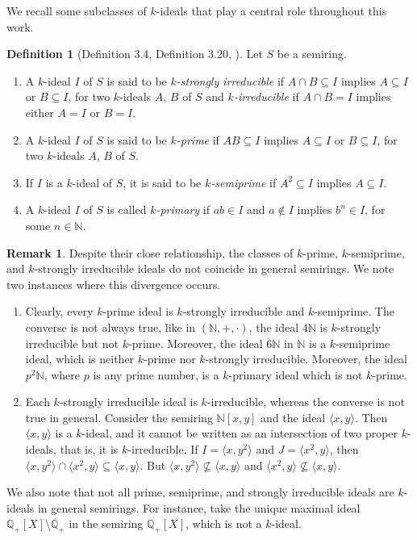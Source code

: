 \documentclass[11pt,english]{amsart}
\theoremstyle{definition}
\newtheorem{definition}[theorem]{Definition}
\newtheorem{remark}[theorem]{Remark}
\numberwithin{equation}{section}
\begin{document}
We recall some subclasses of $k$-ideals that play a central role throughout this work.

\begin{definition}[Definition 3.4, Definition 3.20, \cite{GoswamiDube24}]
Let $S$ be a semiring. 
    \begin{enumerate}
        \item A $k$-ideal $I$ of $S$ is said to be \emph{$k$-strongly irreducible} if $A\cap B \subseteq I$ implies $A\subseteq I$ or $B\subseteq I$, for two $k$-ideals $A$, $B$ of $S$ and \emph{$k$-irreducible} if $A\cap B=I$ implies either $A=I$ or $B=I$.
        
        \item A $k$-ideal $I$ of $S$ is said to be \emph{$k$-prime} if $AB\subseteq I$ implies $A\subseteq I$ or $B\subseteq I$, for two $k$-ideals $A$, $B$ of $S$.
        
        \item If $I$ is a $k$-ideal of $S$, it is said to be \emph{$k$-semiprime} if $A^2\subseteq I$ implies $A\subseteq I$. 
        
        \item A $k$-ideal $I$ of $S$ is called \emph{$k$-primary} if $ab\in I$ and $a\notin I$ implies $b^n\in I$, for some $n\in \mathds{N}$.
    \end{enumerate}
\end{definition}

\begin{remark}\label{Remark: ideal classes are different} Despite their close relationship, the classes of $k$-prime, $k$-semiprime, and $k$-strongly irreducible ideals do not coincide in general semirings. We note two instances where this divergence occurs. 
\begin{enumerate}
    \item Clearly, every $k$-prime ideal is $k$-strongly irreducible and $k$-semiprime. The converse is not always true, like in $(\mathds{N},+,\cdot)$, the ideal $4\mathds{N}$ is $k$-strongly irreducible but not $k$-prime. Moreover, the ideal $6\mathds{N}$ in $\mathds{N}$ is a $k$-semiprime ideal, which is neither $k$-prime nor $k$-strongly irreducible. Moreover, the ideal $p^2\mathds{N}$, where $p$ is any prime number, is a $k$-primary ideal which is not $k$-prime. 
    \item Each $k$-strongly irreducible ideal is $k$-irreducible, whereas the converse is not true in general. Consider the semiring $\mathds{N}[x,y]$ and the ideal $\langle x,y\rangle$. Then $\langle x,y\rangle$ is a $k$-ideal, and it cannot be written as an intersection of two proper $k$-ideals, that is, it is $k$-irreducible. If $I=\langle x,y^2\rangle$ and $J=\langle x^2,y\rangle$, then $\langle x,y^2\rangle \cap \langle x^2,y\rangle \subseteq \langle x,y\rangle$. But $\langle x,y^2\rangle \nsubseteq \langle x,y\rangle$ and $\langle x^2,y\rangle \nsubseteq \langle x,y\rangle$. 
\end{enumerate}
    We also note that not all prime, semiprime, and strongly irreducible ideals are $k$-ideals in general semirings. For instance, take the unique maximal ideal $\mathds{Q}_+[X]\setminus \mathds{Q}_+$ in the semiring $\mathds{Q}_+[X]$, which is not a $k$-ideal. 
\end{remark}
\end{document}
